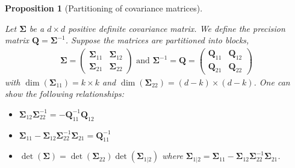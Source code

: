 \documentclass[
  11pt,
  letterpaper,
]{scrbook}
\providecommand{\tightlist}{%
  \setlength{\itemsep}{0pt}\setlength{\parskip}{0pt}}\usepackage{longtable,booktabs,array}
\theoremstyle{definition}
\theoremstyle{plain}
\newtheorem{proposition}{Proposition}[chapter]
\theoremstyle{plain}
\theoremstyle{definition}
\theoremstyle{definition}
\theoremstyle{remark}
\begin{document}
\begin{proposition}[Partitioning of covariance
matrices]\protect\hypertarget{prp-partition-matrix}{}\label{prp-partition-matrix}

Let \(\boldsymbol{\Sigma}\) be a \(d \times d\) positive definite
covariance matrix. We define the precision matrix
\(\boldsymbol{Q} = \boldsymbol{\Sigma}^{-1}\). Suppose the matrices are
partitioned into blocks, \begin{align*}
\boldsymbol{\Sigma}= 
\begin{pmatrix}
\boldsymbol{\Sigma}_{11} & \boldsymbol{\Sigma}_{12} \\
\boldsymbol{\Sigma}_{21} & \boldsymbol{\Sigma}_{22}
\end{pmatrix} \text{ and }
\boldsymbol{\Sigma}^{-1}= \boldsymbol{Q} = 
\begin{pmatrix} 
\boldsymbol{Q}_{11} &\boldsymbol{Q}_{12}
\\ \boldsymbol{Q}_{21} & \boldsymbol{Q}_{22}
\end{pmatrix}
\end{align*} with \(\dim(\boldsymbol{\Sigma}_{11})=k\times k\) and
\(\dim(\boldsymbol{\Sigma}_{22})=(d-k) \times (d-k)\). One can show the
following relationships:

\begin{itemize}
\tightlist
\item
  \(\boldsymbol{\Sigma}_{12}\boldsymbol{\Sigma}_{22}^{-1}=-\boldsymbol{Q}_{11}^{-1}\boldsymbol{Q}_{12}\)
\item
  \(\boldsymbol{\Sigma}_{11}-\boldsymbol{\Sigma}_{12}\boldsymbol{\Sigma}_{22}^{-1}\boldsymbol{\Sigma}_{21}=\boldsymbol{Q}_{11}^{-1}\)
\item
  \(\det(\boldsymbol{\Sigma})=\det(\boldsymbol{\Sigma}_{22})\det(\boldsymbol{\Sigma}_{1|2})\)
  where
  \(\boldsymbol{\Sigma}_{1|2}=\boldsymbol{\Sigma}_{11}-\boldsymbol{\Sigma}_{12}\boldsymbol{\Sigma}_{22}^{-1}\boldsymbol{\Sigma}_{21}\).
\end{itemize}

\end{proposition}
\end{document}
